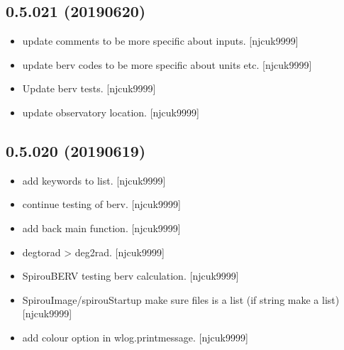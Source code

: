 \documentclass[a4paper,10pt,english]{report}
\begin{document}
\subsection{0.5.021 (2019\sphinxhyphen{}06\sphinxhyphen{}20)}
\label{\detokenize{misc/changelog:id134}}\begin{itemize}
\item {} 
 \sphinxhyphen{} update comments to be more specific about inputs.
{[}njcuk9999{]}

\item {} 
 \sphinxhyphen{} update berv codes to be more specific about units etc.
{[}njcuk9999{]}

\item {} 
Update berv tests. {[}njcuk9999{]}

\item {} 
 \sphinxhyphen{} update observatory location. {[}njcuk9999{]}

\end{itemize}


\subsection{0.5.020 (2019\sphinxhyphen{}06\sphinxhyphen{}19)}
\label{\detokenize{misc/changelog:id135}}\begin{itemize}
\item {} 
 \sphinxhyphen{} add keywords to list. {[}njcuk9999{]}

\item {} 
 \sphinxhyphen{} continue testing of berv. {[}njcuk9999{]}

\item {} 
 \sphinxhyphen{} add back main function. {[}njcuk9999{]}

\item {} 
 \sphinxhyphen{} degtorad \textendash{}\textgreater{} deg2rad. {[}njcuk9999{]}

\item {} 
SpirouBERV \sphinxhyphen{} testing berv calculation. {[}njcuk9999{]}

\item {} 
SpirouImage/spirouStartup \sphinxhyphen{} make sure files is a list (if string make
a list) {[}njcuk9999{]}

\item {} 
 \sphinxhyphen{} add colour option in wlog.printmessage. {[}njcuk9999{]}

\end{itemize}
\end{document}
